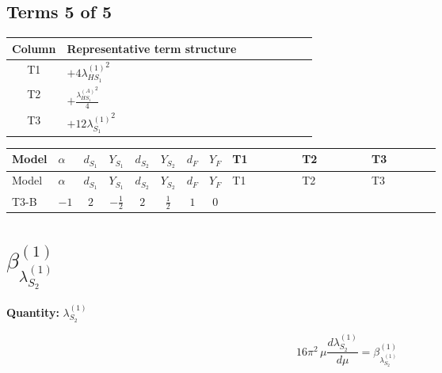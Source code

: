 \documentclass[8pt]{article}
\begin{document}
\begin{landscape}
\subsection*{Terms 5 of 5}
\begin{center}
\begin{tabular}{@{}c >{\raggedright\arraybackslash}p{0.82\linewidth}@{}}
\toprule
Column & Representative term structure \\
\midrule
T1 & \(\displaystyle +4 {\lambda_{HS_1}^{(1)}}^2\) \\
\midrule
T2 & \(\displaystyle +\frac{{\lambda_{HS_1}^{(A)}}^2}{4}\) \\
\midrule
T3 & \(\displaystyle +12 {\lambda_{S_1}^{(1)}}^2\) \\
\midrule
\bottomrule
\end{tabular}
\end{center}
\smallskip
\tiny
\begin{longtable}{@{}llcccccc >{\raggedright\arraybackslash}p{0.21\linewidth} >{\raggedright\arraybackslash}p{0.21\linewidth} >{\raggedright\arraybackslash}p{0.21\linewidth}@{}}
\toprule
Model & $\alpha$ & $d_{S_1}$ & $Y_{S_1}$ & $d_{S_2}$ & $Y_{S_2}$ & $d_F$ & $Y_F$ & T1 & T2 & T3 \\
\midrule
\endfirsthead
\toprule
Model & $\alpha$ & $d_{S_1}$ & $Y_{S_1}$ & $d_{S_2}$ & $Y_{S_2}$ & $d_F$ & $Y_F$ & T1 & T2 & T3 \\
\midrule
\endhead
T3-B & $-1$ & $2$ & $-\frac{1}{2}$ & $2$ & $\frac{1}{2}$ & $1$ & $0$ & \scriptsize\adjustbox{max width=\linewidth}{$\begin{gathered} +4 {\lambda_{HS_1}^{(1)}}^2\end{gathered}$} & \scriptsize\adjustbox{max width=\linewidth}{$\begin{gathered} +\frac{{\lambda_{HS_1}^{(A)}}^2}{4}\end{gathered}$} & \scriptsize\adjustbox{max width=\linewidth}{$\begin{gathered} +12 {\lambda_{S_1}^{(1)}}^2\end{gathered}$} \\
\midrule
\bottomrule
\end{longtable}
\clearpage
\section*{$\beta_{\lambda_{S_2}^{(1)}}^{(1)}$}
\noindent\textbf{Quantity: }$\lambda_{S_2}^{(1)}$\par\smallskip
\[16\pi^2\,\mu\frac{d \lambda_{S_2}^{(1)}}{d\mu}=\beta_{\lambda_{S_2}^{(1)}}^{(1)}\]

\end{landscape}
\end{document}
